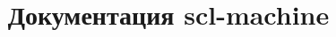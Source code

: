 \documentclass{scndocument}
\begin{document}
\DeactivateBG
\title{\centering
Документация scl-machine}
\author{}
\maketitle

\normalsize

\setcounter{page}{3}

\ActivateBG
\begin{SCn}

\end{SCn}
\end{document}
